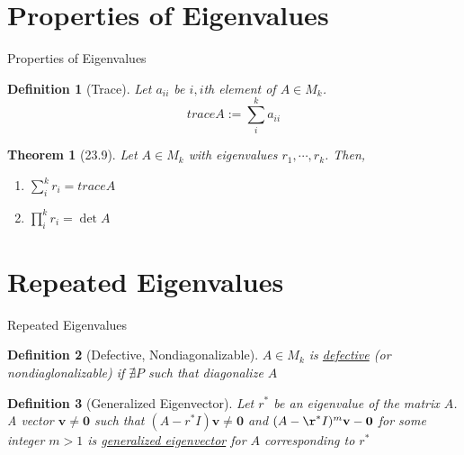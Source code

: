 \documentclass[a4paper,11pt]{article}
\newtheorem{defn}{Definition}
\newtheorem{thm}{Theorem}
\newcommand{\bd}{\mathbf}
\begin{document}
\section{Properties of Eigenvalues} %
\label{sec:properties_of_eigenvalues}
\begin{frame}[t]{Properties of Eigenvalues}
	\begin{defn}
		[Trace] Let $a_{ii}$ be $i,i$th element of $A\in M_k$. \[
			trace A := \sum_i^k a_{ii}
		\]
	\end{defn}
	\begin{thm}
		[23.9] Let $A\in M_k$ with eigenvalues $r_1,\cdots,r_k$. Then, 
		\begin{enumerate}
			\item $\sum_i^k r_i = trace A$
			\item $\prod_i^k r_i = \det A$
		\end{enumerate}
	\end{thm}
\end{frame}

\section{Repeated Eigenvalues} %
\label{sec:repeated_eigenvalues}
\begin{frame}[t]{Repeated Eigenvalues}
	\begin{defn}
		[Defective, Nondiagonalizable]
		$A\in M_k$ is \uline{defective} (or nondiaglonalizable) if $\nexists P$ such that diagonalize $A$
	\end{defn}
	\begin{defn}
		[Generalized Eigenvector] Let $r^\ast$ be an eigenvalue of the matrix $A$. A vector $\bd{v}\neq\bd{0}$ such that $(A-r^\ast I)\bd{v}\neq\bd{0}$ and $(A-\r^\ast I)^m\bd{v}-\bd{0}$ for some integer $m>1$ is \uline{generalized eigenvector} for $A$ corresponding to $r^\ast$
	\end{defn}

\end{frame}
\end{document}

